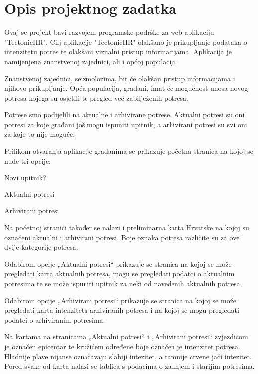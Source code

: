 \chapter{Opis projektnog zadatka}
		


{Ovaj se projekt bavi razvojem programske podrške za web aplikaciju "TectonicHR". 
	Cilj aplikacije "TectonicHR" olakšano je prikupljanje podataka o intenzitetu potres te olakšani vizualni pristup informacijama. 
	Aplikacija je namijenjena znanstvenoj zajednici, ali i općoj populaciji.
	 
	Znanstvenoj zajednici, seizmolozima, bit će olakšan pristup informacijama i njihovo prikupljanje.
	Opća populacija, građani, imat će mogućnost unosa novog potresa kojega su osjetili te pregled već zabilježenih potresa.
	
	Potrese smo podijelili na aktualne i arhivirane potrese. Aktualni potresi su oni potresi za koje građani još mogu ispuniti upitnik, a arhivirani potresi su svi oni za koje to nije moguće.
	
	Prilikom otvaranja aplikacije građanima se prikazuje početna stranica na kojoj se nude tri opcije:
		\begin{packed_item}
			\item Novi upitnik?
			\item Aktualni potresi
			\item Arhivirani potresi
		\end{packed_item}
	Na početnoj stranici također se nalazi i preliminarna karta Hrvatske na kojoj su označeni aktualni i arhivirani potresi. Boje oznaka potresa različite su za ove dvije kategorije potresa.
	
	Odabirom opcije „Aktualni potresi“ prikazuje se stranica na kojoj se može pregledati karta aktualnih potresa, mogu se pregledati podatci o aktualnim potresima te se može ispuniti upitnik za neki od navedenih aktualnih potresa.
	
	Odabirom opcije „Arhivirani potresi“ prikazuje se stranica na kojoj se može pregledati karta intenziteta arhiviranih potresa i na kojoj se mogu pregledati podatci o arhiviranim potresima.
	
	Na kartama na stranicama „Aktualni potresi“ i „Arhivirani potresi“ zvjezdicom je označen epicentar te kružićem određene boje označen je intenzitet potresa. Hladnije plave nijanse označavaju slabiji intezitet, a tamnije crvene jači intezitet. 
	Pored svake od karta nalazi se tablica s podacima o zadnjem i starijim potresima.
	
}
